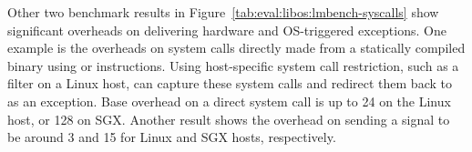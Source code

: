 Other two benchmark results in Figure~\ref{tab:eval:libos:lmbench-syscalls}
show significant overheads
on delivering hardware and OS-triggered exceptions.
One example
is the overheads on system calls directly made from a statically compiled binary
using  or  instructions.
Using host-specific system call restriction,
such as a \seccomp{} filter
on a Linux host,
\graphene{} can capture these system calls %
and redirect them back to \thelibos{} as an exception. %
Base overhead on a direct system call
is up to 24\x{} on the Linux host, or 128\x{} on SGX.
Another result shows the overhead on
sending a  signal
to be around 3\x{} and 15\x{} for Linux and SGX hosts, respectively.















